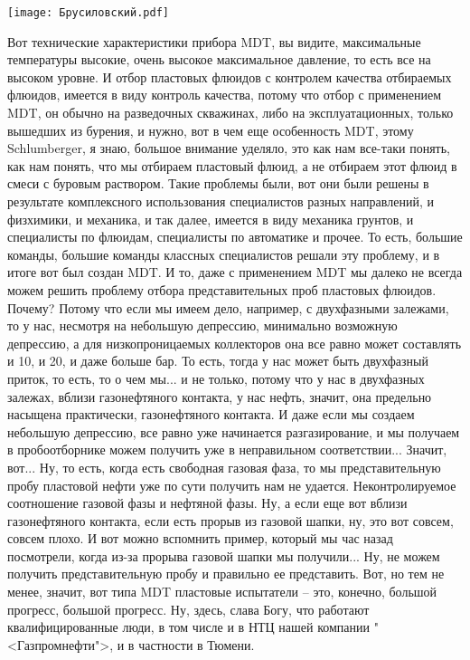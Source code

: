 \documentclass[main.tex]{subfiles}
\begin{document}
\begin{center}
\texttt{[image: Брусиловский.pdf]}
\end{center}

Вот технические характеристики прибора MDT, вы видите, максимальные температуры высокие, очень высокое максимальное давление, то есть все на высоком уровне.
И отбор пластовых флюидов с контролем качества отбираемых флюидов, имеется в виду контроль качества, потому что отбор с применением MDT, он обычно на разведочных скважинах, либо на эксплуатационных, только вышедших из бурения, и нужно, вот в чем еще особенность MDT, этому Schlumberger, я знаю, большое внимание уделяло, это как нам все-таки понять, как нам понять, что мы отбираем пластовый флюид, а не отбираем этот флюид в смеси с буровым раствором.
Такие проблемы были, вот они были решены в результате комплексного использования специалистов разных направлений, и физхимики, и механика, и так далее, имеется в виду механика грунтов, и специалисты по флюидам, специалисты по автоматике и прочее.
То есть, большие команды, большие команды классных специалистов решали эту проблему, и в итоге вот был создан MDT.
И то, даже с применением MDT мы далеко не всегда можем решить проблему отбора представительных проб пластовых флюидов.
Почему?
Потому что если мы имеем дело, например, с двухфазными залежами, то у нас, несмотря на небольшую депрессию, минимально возможную депрессию, а для низкопроницаемых коллекторов она все равно может составлять и 10, и 20, и даже больше бар.
То есть, тогда у нас может быть двухфазный приток, то есть, то о чем мы... и не только, потому что у нас в двухфазных залежах, вблизи газонефтяного контакта, у нас нефть, значит, она предельно насыщена практически, газонефтяного контакта.
И даже если мы создаем небольшую депрессию, все равно уже начинается разгазирование, и мы получаем в пробоотборнике можем получить уже в неправильном соответствии...
Значит, вот...
Ну, то есть, когда есть свободная газовая фаза, то мы представительную пробу пластовой нефти уже по сути получить нам не удается.
Неконтролируемое соотношение газовой фазы и нефтяной фазы.
Ну, а если еще вот вблизи газонефтяного контакта, если есть прорыв из газовой шапки, ну, это вот совсем, совсем плохо.
И вот можно вспомнить пример, который мы час назад посмотрели, когда из-за прорыва газовой шапки мы получили...
Ну, не можем получить представительную пробу и правильно ее представить.
Вот, но тем не менее, значит, вот типа MDT пластовые испытатели -- это, конечно, большой прогресс, большой прогресс.
Ну, здесь, слава Богу, что работают квалифицированные люди, в том числе и в НТЦ нашей компании "<Газпромнефти">, и в частности в Тюмени.
\end{document}
